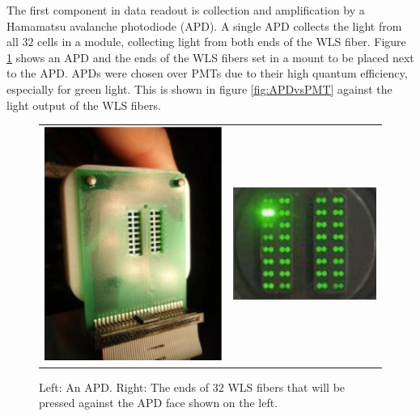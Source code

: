The first component in data readout is collection and amplification by a Hamamatsu avalanche photodiode (APD). A single APD collects the light from all $32$ cells in a module, collecting light from both ends of the WLS fiber. Figure \ref{fig:DetAPD} shows an APD and the ends of the WLS fibers set in a mount to be placed next to the APD. APDs were chosen over PMTs due to their high quantum efficiency, especially for green light. This is shown in figure \ref{fig:APDvsPMT} against the light output of the WLS fibers.
\begin{figure}[htb]
  \centering
  \begin{tabular}{c c}
    \includegraphics[width=.47\textwidth]{figures/DetAPD.png} &
    \includegraphics[width=.47\textwidth]{figures/DetFiberEnd.png} \\
  \end{tabular}
  \caption[An APD]{Left: An APD. Right: The ends of $32$ WLS fibers that will be pressed against the APD face shown on the left.}
  \label{fig:DetAPD}
\end{figure}

